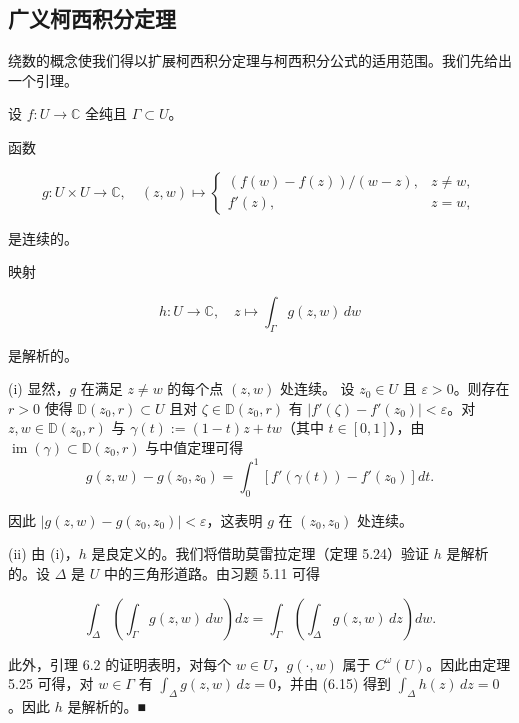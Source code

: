 \subsection*{广义柯西积分定理}

绕数的概念使我们得以扩展柯西积分定理与柯西积分公式的适用范围。我们先给出一个引理。

\begin{lemma}

设 $ f : U \to \mathbb{C} $ 全纯且 $ \Gamma \subset U $。

\begin{subitems}
\item

函数

\begin{equation*}
g : U\times U \to \mathbb{C} , \quad (z,w) \mapsto \begin{cases} (f(w) - f(z))/(w - z) , & z \ne w , \\ f'(z) , & z = w , \end{cases}
\end{equation*}

是连续的。

\item

映射

\[
h : U \to \mathbb{C} , \quad z \mapsto \int_{\Gamma}g(z,w)\,dw
\]

是解析的。

\proofhead
(i) 显然，$ g $ 在满足 $ z \ne w $ 的每个点 $ (z,w) $ 处连续。
设 $ z_{0} \in U $ 且 $ \varepsilon > 0 $。则存在 $ r > 0 $ 使得 $ \mathbb{D}(z_{0},r) \subset U $ 且对 $ \zeta \in \mathbb{D}(z_{0},r) $ 有 $ |f'(\zeta) - f'(z_{0})| < \varepsilon $。对 $ z,w \in \mathbb{D}(z_{0},r) $ 与 $ \gamma(t) := (1 - t)z + tw $（其中 $ t \in [0,1] $），由 $ \operatorname{im}(\gamma) \subset \mathbb{D}(z_{0},r) $ 与中值定理可得
\[
g(z,w) - g(z_{0},z_{0}) = \int_{0}^{1}\left[f'(\gamma(t)) - f'(z_{0})\right]dt .
\]

因此 $ |g(z,w) - g(z_{0},z_{0})| < \varepsilon $，这表明 $ g $ 在 $ (z_{0},z_{0}) $ 处连续。

\end{subitems}

(ii) 由 (i)，$ h $ 是良定义的。我们将借助莫雷拉定理（定理 5.24）验证 $ h $ 是解析的。设 $ \Delta $ 是 $ U $ 中的三角形道路。由习题 5.11 可得

\begin{equation}
\int_{\Delta}\left(\int_{\Gamma}g(z,w)\,dw\right)dz = \int_{\Gamma}\left(\int_{\Delta}g(z,w)\,dz\right)dw .\tag{6.15}
\end{equation}

此外，引理 6.2 的证明表明，对每个 $ w \in U $，$ g(\cdot,w) $ 属于 $ C^{\omega}(U) $。因此由定理 5.25 可得，对 $ w \in \Gamma $ 有 $ \int_{\Delta}g(z,w)\,dz = 0 $，并由 (6.15) 得到 $ \int_{\Delta}h(z)\,dz = 0 $。因此 $ h $ 是解析的。\nobreak\hspace{0.35em}■

\end{lemma}

